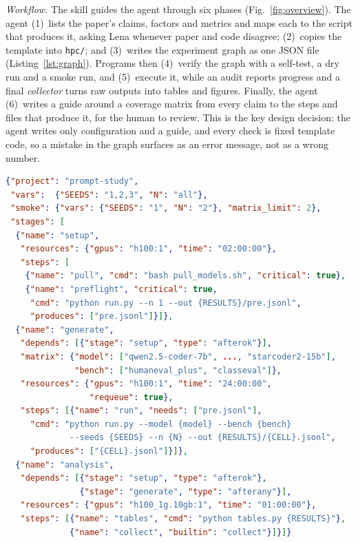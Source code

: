 \documentclass[10pt,conference]{IEEEtran}
\newcommand{\code}[1]{\texttt{#1}}
\begin{document}
\emph{Workflow.} The skill guides the agent through six phases (Fig.~\ref{fig:overview}). The agent (1)~lists the paper's claims, factors and metrics and maps each to the script that produces it, asking Lena whenever paper and code disagree; (2)~copies the template into \code{hpc/}; and (3)~writes the experiment graph as one JSON file (Listing~\ref{lst:graph}). Programs then (4)~verify the graph with a self-test, a dry run and a smoke run, and (5)~execute it, while an audit reports progress and a final \emph{collector} turns raw outputs into tables and figures. Finally, the agent (6)~writes a guide around a coverage matrix from every claim to the steps and files that produce it, for the human to review. This is the key design decision: the agent writes only configuration and a guide, and every check is fixed template code, so a mistake in the graph surfaces as an error message, not as a wrong number.

\begin{lstlisting}[language=json, caption={Lena's experiment graph (\code{hpc/config/experiments.json}). ``\ldots'' elides five models and the \code{run} command is wrapped for print; with both restored, the file passes the self-test. \code{\{RESULTS\}} and \code{\{CELL\}} are set by the runner.}, label=lst:graph, float=t]
{"project": "prompt-study",
 "vars":  {"SEEDS": "1,2,3", "N": "all"},
 "smoke": {"vars": {"SEEDS": "1", "N": "2"}, "matrix_limit": 2},
 "stages": [
  {"name": "setup",
   "resources": {"gpus": "h100:1", "time": "02:00:00"},
   "steps": [
    {"name": "pull", "cmd": "bash pull_models.sh", "critical": true},
    {"name": "preflight", "critical": true,
     "cmd": "python run.py --n 1 --out {RESULTS}/pre.jsonl",
     "produces": ["pre.jsonl"]}]},
  {"name": "generate",
   "depends": [{"stage": "setup", "type": "afterok"}],
   "matrix": {"model": ["qwen2.5-coder-7b", ..., "starcoder2-15b"],
              "bench": ["humaneval_plus", "classeval"]},
   "resources": {"gpus": "h100:1", "time": "24:00:00",
                 "requeue": true},
   "steps": [{"name": "run", "needs": ["pre.jsonl"],
     "cmd": "python run.py --model {model} --bench {bench}
             --seeds {SEEDS} --n {N} --out {RESULTS}/{CELL}.jsonl",
     "produces": ["{CELL}.jsonl"]}]},
  {"name": "analysis",
   "depends": [{"stage": "setup", "type": "afterok"},
               {"stage": "generate", "type": "afterany"}],
   "resources": {"gpus": "h100_1g.10gb:1", "time": "01:00:00"},
   "steps": [{"name": "tables", "cmd": "python tables.py {RESULTS}"},
             {"name": "collect", "builtin": "collect"}]}]}
\end{lstlisting}
\end{document}

